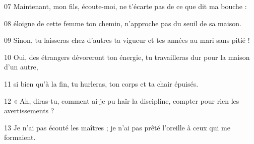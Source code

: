 
07 Maintenant, mon fils, écoute-moi, ne t’écarte pas de ce que dit ma bouche :

08 éloigne de cette femme ton chemin, n’approche pas du seuil de sa maison.

09 Sinon, tu laisseras chez d’autres ta vigueur et tes années au mari sans pitié !

10 Oui, des étrangers dévoreront ton énergie, tu travailleras dur pour la maison d’un autre,

11 si bien qu’à la fin, tu hurleras, ton corps et ta chair épuisés.

12 « Ah, diras-tu, comment ai-je pu haïr la discipline, compter pour rien les avertissements ?

13 Je n’ai pas écouté les maîtres ; je n’ai pas prêté l’oreille à ceux qui me formaient.
